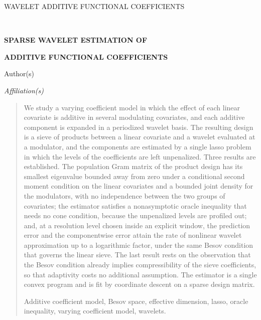 \documentclass[12pt]{article} %
\theoremstyle{definition}
\begin{document}
\renewcommand{\baselinestretch}{2}


{\hfill {\footnotesize\rm WAVELET ADDITIVE FUNCTIONAL COEFFICIENTS} \hfill}

\renewcommand{\thefootnote}{}
$\ $\par


\fontsize{12}{14pt plus.8pt minus .6pt}\selectfont \vspace{0.8pc}
\centerline{\large\bf SPARSE WAVELET ESTIMATION OF}
\vspace{2pt}
\centerline{\large\bf ADDITIVE FUNCTIONAL COEFFICIENTS}
\vspace{.4cm}
\centerline{Author(s)}
\vspace{.4cm}
\centerline{\it Affiliation(s)}
\vspace{.55cm} \fontsize{9}{11.5pt plus.8pt minus.6pt}\selectfont


\begin{quotation}
We study a varying coefficient model in which the effect of each linear
covariate is additive in several modulating covariates, and each additive
component is expanded in a periodized wavelet basis. The resulting design is
a sieve of products between a linear covariate and a wavelet evaluated at a
modulator, and the components are estimated by a single lasso problem in
which the levels of the coefficients are left unpenalized. Three results are
established. The population Gram matrix of the product design has its
smallest eigenvalue bounded away from zero under a conditional second moment
condition on the linear covariates and a bounded joint density for the
modulators, with no independence between the two groups of covariates; the
estimator satisfies a nonasymptotic oracle inequality that needs no cone
condition, because the unpenalized levels are profiled out; and, at a
resolution level chosen inside an explicit window, the prediction error and
the componentwise error attain the rate of nonlinear wavelet approximation up
to a logarithmic factor, under the same Besov condition that governs the
linear sieve. The last result rests on the observation that the Besov
condition already implies compressibility of the sieve coefficients, so that
adaptivity costs no additional assumption. The estimator is a single convex
program and is fit by coordinate descent on a sparse design matrix.

\vspace{9pt}
Additive coefficient model, Besov space, effective dimension, lasso, oracle
inequality, varying coefficient model, wavelets.
\par
\end{quotation}\par
\end{document}

